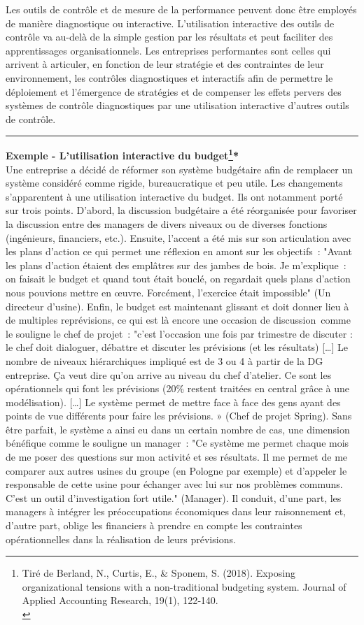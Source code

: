 \documentclass{kaobook}
\begin{document}
Les outils de contrôle et de mesure de la performance peuvent donc être employés de manière diagnostique ou interactive. L'utilisation interactive des outils de contrôle va au-delà de la simple gestion par les résultats et peut faciliter des apprentissages organisationnels. Les entreprises performantes sont celles qui arrivent à articuler, en fonction de leur stratégie et des contraintes de leur environnement, les contrôles diagnostiques et interactifs afin de permettre le déploiement et l'émergence de stratégies et de compenser les effets pervers des systèmes de contrôle diagnostiques par une utilisation interactive d'autres outils de contrôle.\\

\noindent\rule{\textwidth}{0.5pt}
\textbf{Exemple - L'utilisation interactive du budget\footnote{Tiré de Berland, N., Curtis, E., \& Sponem, S. (2018). Exposing organizational tensions with a non-traditional budgeting system. Journal of Applied Accounting Research, 19(1), 122‑140.\\}*}\\
Une entreprise a décidé de réformer son système budgétaire afin de remplacer un système considéré comme rigide, bureaucratique et peu utile. Les changements s'apparentent à une utilisation interactive du budget. Ils ont notamment porté sur trois points. D'abord, la discussion budgétaire a été réorganisée pour favoriser la discussion entre des managers de divers niveaux ou de diverses fonctions (ingénieurs, financiers, etc.). Ensuite, l'accent a été mis sur son articulation avec les plans d'action ce qui permet une réflexion en amont sur les objectifs : "Avant les plans d'action étaient des emplâtres sur des jambes de bois. Je m'explique : on faisait le budget et quand tout était bouclé, on regardait quels plans d'action nous pouvions mettre en œuvre. Forcément, l'exercice était impossible" (Un directeur d'usine). Enfin, le budget est maintenant glissant et doit donner lieu à de multiples reprévisions, ce qui est là encore une occasion de discussion comme le souligne le chef de projet : "c'est l'occasion une fois par trimestre de discuter : le chef doit dialoguer, débattre et discuter les prévisions (et les résultats) [\ldots{}] Le nombre de niveaux hiérarchiques impliqué est de 3 ou 4 à partir de la DG entreprise. Ça veut dire qu'on arrive au niveau du chef d'atelier. Ce sont les opérationnels qui font les prévisions (20\% restent traitées en central grâce à une modélisation). [\ldots{}] Le système permet de mettre face à face des gens ayant des points de vue différents pour faire les prévisions. » (Chef de projet Spring). Sans être parfait, le système a ainsi eu dans un certain nombre de cas, une dimension bénéfique comme le souligne un manager : "Ce système me permet chaque mois de me poser des questions sur mon activité et ses résultats. Il me permet de me comparer aux autres usines du groupe (en Pologne par exemple) et d'appeler le responsable de cette usine pour échanger avec lui sur nos problèmes communs. C'est un outil d'investigation fort utile." (Manager). Il conduit, d'une part, les managers à intégrer les préoccupations économiques dans leur raisonnement et, d'autre part, oblige les financiers à prendre en compte les contraintes opérationnelles dans la réalisation de leurs prévisions.\\
\end{document}
